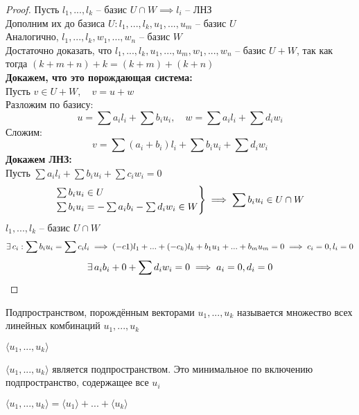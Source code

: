 \begin{proof}
    Пусть $ l_1, ..., l_k $ -- базис $ U \cap W \implies l_i $ -- ЛНЗ \\
    Дополним их до базиса $U : l_1, ..., l_k, u_1, ..., u_m $ -- базис $U$ \\
    Аналогично, $ l_1, ..., l_k, w_1, ..., w_n $ -- базис $W$ \\
    Достаточно доказать, что $ l_1, ..., l_k, u_1, ..., u_m, w_1, ..., w_n $ -- базис $ U + W $, так как тогда $ (k + m + n) + k = (k + m) + (k + n) $ \\
    \textbf{Докажем, что это порождающая система:} \\
    Пусть $ v \in U + W, \quad v = u + w $ \\
    Разложим по базису:
    $$ u = \sum a_il_i + \sum b_iu_i, \quad w = \sum a_il_i + \sum d_iw_i $$
    Сложим:
    $$ v = \sum(a_i + b_i)l_i + \sum b_i u_i + \sum d_i w_i $$
    \textbf{Докажем ЛНЗ:} \\
    Пусть $ \sum a_il_i + \sum b_i u_i + \sum c_i w_i = 0 $
    $$
    \begin{rcases}
    	\sum b_i u_i \in U \\
        \sum b_i u_i = - \sum a_i b_i - \sum d_i w_i \in W
    \end{rcases} \implies \sum b_iu_i \in U \cap W $$
    $ l_1, ..., l_k $ -- базис $ U \cap W $
    $$ \exists\, c_i : \sum b_iu_i = \sum c_il_i \implies (-c1)l_1 + ... + (-c_k)l_k + b_1u_1 + ... + b_mu_m = 0 \implies c_i = 0, l_i = 0 $$
    $$ \exists\, a_ib_i + 0 + \sum d_iw_i = 0 \implies a_i = 0, d_i = 0 $$
\end{proof}

\begin{definition}
	Подпространством, порождённым векторами $ u_1, ..., u_k $ называется множество всех линейных комбинаций $u_1, ..., u_k $
\end{definition}

\begin{notation}
	$ \langle u_1, ..., u_k \rangle $
\end{notation}

\begin{props}
	\item $ \langle u_1, ..., u_k \rangle $ является подпространством. Это минимальное по включению подпространство, содержащее все $u_i$
    \item $ \langle u_1, ..., u_k \rangle = \langle u_1 \rangle + ... + \langle u_k \rangle $
\end{props}

